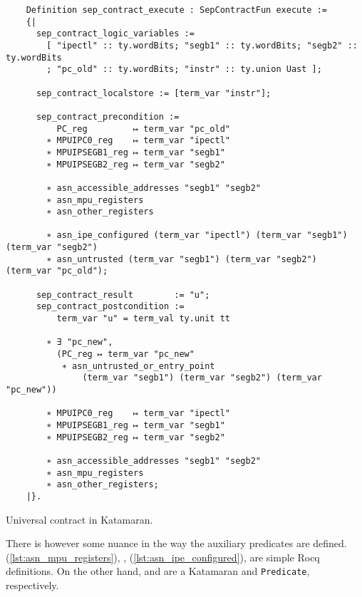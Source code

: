 \begin{listing}
  \begin{verbatim}
    Definition sep_contract_execute : SepContractFun execute :=
    {|
      sep_contract_logic_variables :=
        [ "ipectl" :: ty.wordBits; "segb1" :: ty.wordBits; "segb2" :: ty.wordBits
        ; "pc_old" :: ty.wordBits; "instr" :: ty.union Uast ];

      sep_contract_localstore := [term_var "instr"];

      sep_contract_precondition :=
          PC_reg         ↦ term_var "pc_old"
        ∗ MPUIPC0_reg    ↦ term_var "ipectl"
        ∗ MPUIPSEGB1_reg ↦ term_var "segb1"
        ∗ MPUIPSEGB2_reg ↦ term_var "segb2"

        ∗ asn_accessible_addresses "segb1" "segb2"
        ∗ asn_mpu_registers
        ∗ asn_other_registers

        ∗ asn_ipe_configured (term_var "ipectl") (term_var "segb1") (term_var "segb2")
        ∗ asn_untrusted (term_var "segb1") (term_var "segb2") (term_var "pc_old");

      sep_contract_result        := "u";
      sep_contract_postcondition :=
          term_var "u" = term_val ty.unit tt

        ∗ ∃ "pc_new",
          (PC_reg ↦ term_var "pc_new"
           ∗ asn_untrusted_or_entry_point
               (term_var "segb1") (term_var "segb2") (term_var "pc_new"))

        ∗ MPUIPC0_reg    ↦ term_var "ipectl"
        ∗ MPUIPSEGB1_reg ↦ term_var "segb1"
        ∗ MPUIPSEGB2_reg ↦ term_var "segb2"

        ∗ asn_accessible_addresses "segb1" "segb2"
        ∗ asn_mpu_registers
        ∗ asn_other_registers;
    |}.
  \end{verbatim}
  \caption{Universal contract in Katamaran.}
  \label{lst:universal-contract}
\end{listing}

There is however some nuance in the way the auxiliary predicates are defined.  (\cref{lst:asn_mpu_registers}), ,  (\cref{lst:asn_ipe_configured}), \linebreak {} are simple Rocq definitions. On the other hand, \linebreak {} and  are a Katamaran  and \texttt{Pred\-i\-cate}, respectively.

